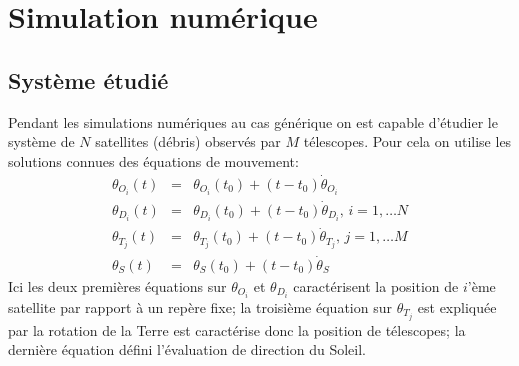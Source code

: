 
\section{Simulation num\'erique}

\subsection{Syst\`eme \'etudi\'e}
Pendant les simulations num\'eriques au cas g\'en\'erique on est capable 
d'\'etudier le syst\`eme de $N$ satellites (d\'ebris) observ\'es par $M$
t\'elescopes. Pour cela on utilise les solutions connues des \'equations 
de mouvement: 
\begin{eqnarray}
   \theta_{O_i}(t) &=& \theta_{O_i}(t_0) + (t-t_0)\dot \theta_{O_i}  \nonumber \\
   \theta_{D_i}(t) &=& \theta_{D_i}(t_0) + (t-t_0)\dot \theta_{D_i} , \, i = 1, \dots N \label{vladimir:sat} \\
   \theta_{T_j}(t) &=& \theta_{T_j}(t_0) + (t-t_0)\dot \theta_{T_j} , \, j = 1, \dots M \label{vladimir:tel} \\
   \theta_S(t) &=& \theta_S(t_0) +  (t-t_0)\dot\theta_S  \label{vladimir:sun} 
\end{eqnarray}
Ici les deux premi\`eres \'equations sur $\theta_{O_i}$ et $\theta_{D_i}$ caract\'erisent 
la position de $i$'\`eme satellite par rapport \`a un rep\`ere fixe; la troisi\`eme \'equation 
sur $\theta_{T_j}$ est expliqu\'ee par la rotation de la Terre est caract\'erise donc 
la position de t\'elescopes; la derni\`ere \'equation d\'efini l'\'evaluation de direction 
du Soleil. 

